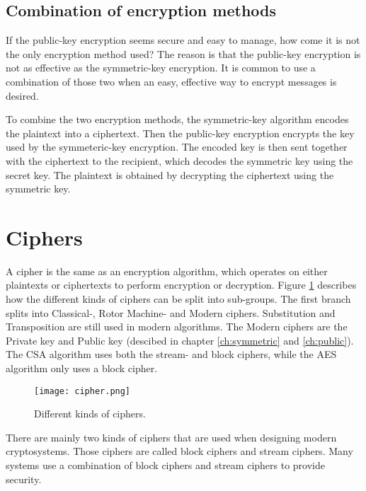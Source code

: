 \subsection{Combination of encryption methods}
If the public-key encryption seems secure and easy to manage, how 
come it is not the only encryption method used? The reason is that the 
public-key encryption is not as effective as the symmetric-key 
encryption. It is common to use a combination of those two when 
an easy, effective way to encrypt messages is desired.

To combine the two encryption methods, the symmetric-key algorithm 
encodes the plaintext into a ciphertext. Then the public-key 
encryption encrypts the key used by the symmeteric-key encryption. The 
encoded key is then sent together with the ciphertext to the 
recipient, which decodes the symmetric key using the secret key. The 
plaintext is obtained by decrypting the ciphertext using the symmetric 
key.


\section{Ciphers}
A cipher is the same as an encryption algorithm, which operates on 
either plaintexts or ciphertexts to perform encryption or decryption. 
Figure \ref{img:ciphers} describes how the different kinds of ciphers 
can be split into sub-groups. The first branch splits into Classical-, 
Rotor Machine- and Modern ciphers. Substitution and Transposition are 
still used in modern algorithms. The Modern ciphers are the Private 
key and Public key (descibed in chapter \ref{ch:symmetric} and 
\ref{ch:public}). The CSA algorithm uses both the stream- and block 
ciphers, while the AES algorithm only uses a block cipher.

\begin{figure}
  \texttt{[image: cipher.png]}
  \caption{Different kinds of ciphers. \citep{CipherTax:2013}}
  \label{img:ciphers}
\end{figure}

There are mainly two kinds of ciphers that are used when designing 
modern cryptosystems. Those ciphers are called block ciphers and 
stream ciphers. Many systems use a combination of block ciphers and 
stream ciphers to provide security. 
